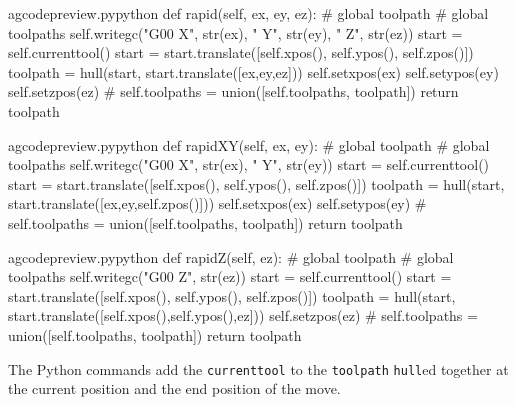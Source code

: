 \documentclass{ltxdoc}
\begin{document}
\lstset{firstnumber=\thegcpy}
\begin{writecode}{a}{gcodepreview.py}{python}
    def rapid(self, ex, ey, ez):
#        global toolpath
#        global toolpaths
        self.writegc("G00 X", str(ex), " Y", str(ey), " Z", str(ez))
        start = self.currenttool()
        start = start.translate([self.xpos(), self.ypos(), self.zpos()])
        toolpath = hull(start, start.translate([ex,ey,ez]))
        self.setxpos(ex)
        self.setypos(ey)
        self.setzpos(ez)
#        self.toolpaths = union([self.toolpaths, toolpath])
        return toolpath
        
\end{writecode}
\addtocounter{gcpy}{13}

\lstset{firstnumber=\thegcpy}
\begin{writecode}{a}{gcodepreview.py}{python}
    def rapidXY(self, ex, ey):
#        global toolpath
#        global toolpaths
        self.writegc("G00 X", str(ex), " Y", str(ey))
        start = self.currenttool()
        start = start.translate([self.xpos(), self.ypos(), self.zpos()])
        toolpath = hull(start, start.translate([ex,ey,self.zpos()]))
        self.setxpos(ex)
        self.setypos(ey)
#        self.toolpaths = union([self.toolpaths, toolpath])
        return toolpath
        
\end{writecode}
\addtocounter{gcpy}{12}

\lstset{firstnumber=\thegcpy}
\begin{writecode}{a}{gcodepreview.py}{python}
    def rapidZ(self, ez):
#        global toolpath
#        global toolpaths
        self.writegc("G00 Z", str(ez))
        start = self.currenttool()
        start = start.translate([self.xpos(), self.ypos(), self.zpos()])
        toolpath = hull(start, start.translate([self.xpos(),self.ypos(),ez]))
        self.setzpos(ez)
#        self.toolpaths = union([self.toolpaths, toolpath])
        return toolpath
        
\end{writecode}
\addtocounter{gcpy}{11}

The Python commands  add the \verb|currenttool| to the \verb|toolpath| \verb|hull|ed together at the current position and the end position of the move.
\end{document}
